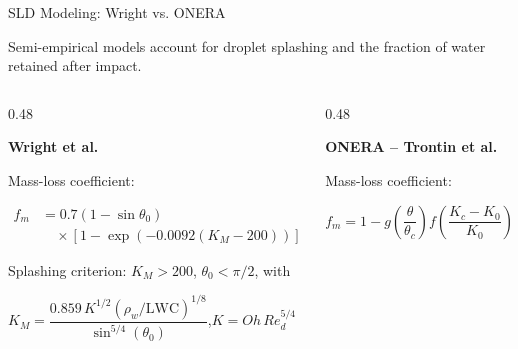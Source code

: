 \begin{frame}{SLD Modeling: Wright vs. ONERA}

\vspace{-0.1cm}

{\small
Semi-empirical models account for droplet splashing
and the fraction of water retained after impact.
}

\vspace{0.1cm}

\begin{columns}[T,onlytextwidth]

\begin{column}{0.48\textwidth}

{\color{champsBlue}\bfseries
Wright et al.}

\vspace{0.08cm}

{\small Mass-loss coefficient:}

{\small\vspace{-0.25cm}
\[
\begin{aligned}
f_m &= 0.7(1-\sin\theta_0)\\
&\quad\times
\left[1-\exp\left(-0.0092(K_M-200)\right)\right]
\end{aligned}
\]}

\vspace{-0.12cm}

{\scriptsize
Splashing criterion: $K_M>200$,
$\theta_0<\pi/2$, with\par\vspace{0.03cm}
{\centering$K_M=\dfrac{0.859\,K^{1/2}\left(\rho_w/\mathrm{LWC}\right)^{1/8}}{\sin^{5/4}(\theta_0)}$,\quad $K=Oh\,Re_d^{5/4}$\par}
}

\end{column}

\begin{column}{0.48\textwidth}

{\color{champsBlue}\bfseries
ONERA -- Trontin et al.}

\vspace{0.08cm}

{\small Mass-loss coefficient:}

{\small\vspace{-0.25cm}
\[
f_m =
1-
g\left(\frac{\theta}{\theta_c}\right)
f\left(\frac{K_c-K_0}{K_0}\right)
\]}


\end{column}
\end{columns}
\end{frame}
